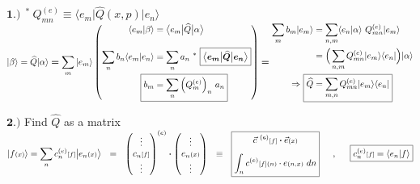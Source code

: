 \documentclass[12pt]{article}
\newcommand*{\dotP}{\boldsymbol \cdot}	%
\begin{document}
\vspace{20pt}\noindent 
\(\boldsymbol{1.)} \ \ ^* \ \boxed{ Q_{mn}^{(e)} \equiv 
    \big\langle e_m \big| \widehat{Q}{\scriptstyle(x,p)} \big| e_n \big\rangle }\) \\[5pt]
\( \displaystyle 
    | \beta \rangle = \widehat{Q} | \alpha \rangle \boldsymbol{=} \sum_m | e_m \rangle
    \left( \begin{aligned}
        \langle e_m | \beta \rangle 
            &= \big\langle e_m \big| \widehat{Q} \big| \alpha \big\rangle \\[10pt]
        \sum_n b_n \langle e_m | e_n \rangle 
            &= \sum_n a_n \ ^*\ \boldsymbol{ \boxed{ \big\langle e_m \big| \widehat{Q} \big| e_n \big\rangle } }\\
        \Aboxed{ b_m &= \sum_n \Big( Q_m^{(e)} \Big)_n \ a_n }
    \end{aligned} \right) \boldsymbol{=} \begin{aligned}
        \sum_m b_m | e_m \rangle 
            &= \sum_{n,m} \langle e_n | \alpha \rangle \ Q_{mn}^{(e)} | e_m \rangle \\
        &= \Big( \sum_{n,m} Q_{mn}^{(e)} | e_m \rangle \langle e_n | \Big) |\alpha \rangle \\
        \Rightarrow \ \Aboxed{ \widehat{Q}
            &= \sum_{m,n} Q_{mn}^{(e)} | e_m \rangle \langle e_n | }     
    \end{aligned} 
\)

\vspace{20pt} \noindent
\(\boldsymbol{2.)}\) Find \(\widehat{Q}\) as a matrix\\
\( \displaystyle
    | f {\scriptstyle(x)} \rangle = \sum_n c_n^{(e)}{\scriptstyle[f]} 
        \big| e_n{\scriptstyle(x)} \big\rangle 
    \ \ = \ \ 
    \left( \begin{matrix} 
        \vdots\\
        c_n{\scriptstyle[f]}\\
        \vdots
    \end{matrix} \right)^{(e)} \dotP
    \left( \begin{matrix} 
        \vdots\\
        e_n{\scriptstyle(x)}\\
        \vdots
    \end{matrix} \right)
    \ \ \equiv \ \
    \boxed{ \begin{gathered}
        \vec{c}^{\ (e)}{\scriptstyle[f]} \dotP \vec{e}{\scriptstyle(x)} \\[5pt]
        \int_n c^{(e)}{\scriptstyle[f]}{\scriptstyle(n)} \cdot e{\scriptstyle(n, x)} \ dn
    \end{gathered} } 
    \indent , \indent 
    \boxed{ c_n^{(e)}{\scriptstyle[f]} = \langle e_n | f \rangle }
\)
\end{document}
